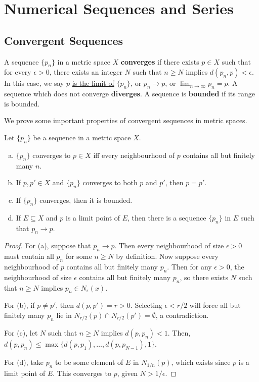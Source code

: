 
\chapter{Numerical Sequences and Series}

\section{Convergent Sequences}
\begin{definition}
A sequence $\{p_n\}$ in a metric space $X$ \textbf{converges} if there exists $p \in X$ such that for every $\epsilon > 0$, there exists an integer $N$ such that $n \ge N$ implies $d(p_n, p) < \epsilon$. In this case, we say $p$ \underline{is the limit of} $\{p_n\}$, or $p_n \to p$, or $\lim_{n \to \infty} p_n = p$. A sequence which does not converge \textbf{diverges}. A sequence is \textbf{bounded} if its range is bounded.
\end{definition}

We prove some important properties of convergent sequences in metric spaces.

\begin{theorem} %
Let $\{p_n\}$ be a sequence in a metric space $X$. 
\begin{enumerate}[(a)]
\item $\{p_n\}$ converges to $p \in X$ iff every neighbourhood of $p$ contains all but finitely many $n$.
\item If $p, p' \in X$ and $\{p_n\}$ converges to both $p$ and $p'$, then $p = p'$. 
\item If $\{p_n\}$ converges, then it is bounded.
\item If $E \subseteq X$ and $p$ is a limit point of $E$, then there is a sequence $\{p_n\}$ in $E$ such that $p_n \to p$. 
\end{enumerate}

\begin{proof}
For (a), suppose that $p_n \to p$. Then every neighbourhood of size $\epsilon > 0$ must contain all $p_n$ for some $n \ge N$ by definition. Now suppose every neighbourhood of $p$ contains all but finitely many $p_n$. Then for any $\epsilon > 0$, the neighbourhood of size $\epsilon$ contains all but finitely many $p_n$, so there exists $N$ such that $n \ge N$ implies $p_n \in N_\epsilon(x)$. 

For (b), if $p \ne p'$, then $d(p, p') = r > 0$. Selecting $\epsilon < r/2$ will force all but finitely many $p_n$ lie in $N_{r/2}(p) \cap N_{r/2}(p') = \emptyset$, a contradiction.

For (c), let $N$ such that $n \ge N$ implies $d(p, p_n) < 1$. Then, $d(p, p_n) \le \max\{d(p, p_1), \dotsc, d(p, p_{N-1}), 1\}$.

For (d), take $p_n$ to be some element of $E$ in $N_{1/n}(p)$, which exists since $p$ is a limit point of $E$. This converges to $p$, given $N > 1/\epsilon$. 
\end{proof}
\end{theorem}

